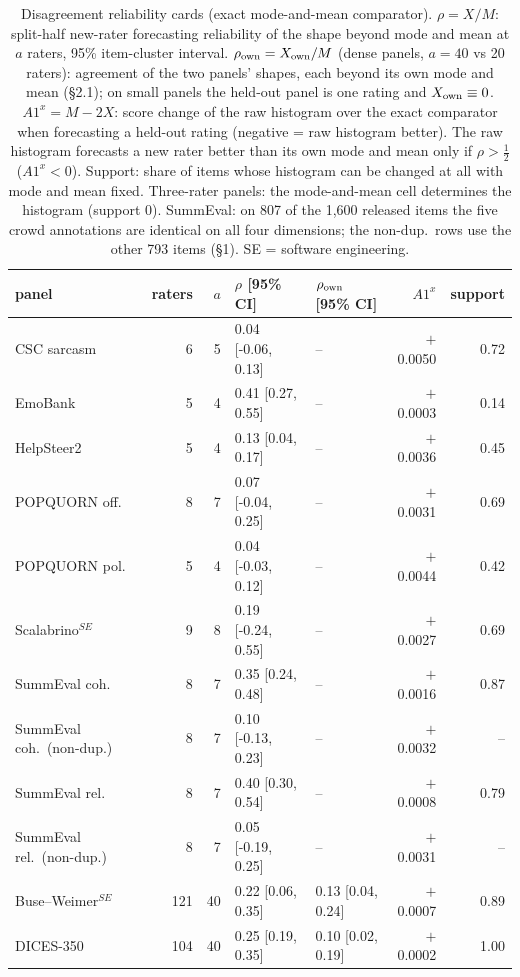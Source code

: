 \begin{table}[t]\centering\footnotesize
\caption{Disagreement reliability cards (exact mode-and-mean comparator). $\rho=X/M$: split-half new-rater forecasting reliability of the shape beyond mode and mean at $a$ raters, 95\% item-cluster interval. $\rho_{\rm own}=X_{\rm own}/M$ (dense panels, $a=40$ vs 20 raters): agreement of the two panels' shapes, each beyond its own mode and mean (\S2.1); on small panels the held-out panel is one rating and $X_{\rm own}\equiv0$. $A1^x=M-2X$: score change of the raw histogram over the exact comparator when forecasting a held-out rating (negative = raw histogram better). The raw histogram forecasts a new rater better than its own mode and mean only if $\rho>\tfrac12$ ($A1^x<0$). Support: share of items whose histogram can be changed at all with mode and mean fixed. Three-rater panels: the mode-and-mean cell determines the histogram (support 0). SummEval: on 807 of the 1,600 released items the five crowd annotations are identical on all four dimensions; the non-dup.\ rows use the other 793 items (\S1). SE = software engineering.}\label{tab:cards}
\begin{tabular}{lrrllrr}\toprule panel & raters & $a$ & $\rho$ [95\% CI] & $\rho_{\rm own}$ [95\% CI] & $A1^x$ & support \\\midrule
CSC sarcasm & 6 & 5 & 0.04 [-0.06, 0.13] & -- & $+$0.0050 & 0.72 \\
EmoBank & 5 & 4 & 0.41 [0.27, 0.55] & -- & $+$0.0003 & 0.14 \\
HelpSteer2 & 5 & 4 & 0.13 [0.04, 0.17] & -- & $+$0.0036 & 0.45 \\
POPQUORN off. & 8 & 7 & 0.07 [-0.04, 0.25] & -- & $+$0.0031 & 0.69 \\
POPQUORN pol. & 5 & 4 & 0.04 [-0.03, 0.12] & -- & $+$0.0044 & 0.42 \\
Scalabrino$^{SE}$ & 9 & 8 & 0.19 [-0.24, 0.55] & -- & $+$0.0027 & 0.69 \\
SummEval coh. & 8 & 7 & 0.35 [0.24, 0.48] & -- & $+$0.0016 & 0.87 \\
SummEval coh.\ (non-dup.) & 8 & 7 & 0.10 [-0.13, 0.23] & -- & $+$0.0032 & -- \\
SummEval rel. & 8 & 7 & 0.40 [0.30, 0.54] & -- & $+$0.0008 & 0.79 \\
SummEval rel.\ (non-dup.) & 8 & 7 & 0.05 [-0.19, 0.25] & -- & $+$0.0031 & -- \\
Buse--Weimer$^{SE}$ & 121 & 40 & 0.22 [0.06, 0.35] & 0.13 [0.04, 0.24] & $+$0.0007 & 0.89 \\
DICES-350 & 104 & 40 & 0.25 [0.19, 0.35] & 0.10 [0.02, 0.19] & $+$0.0002 & 1.00 \\

\end{tabular}
\end{table}
